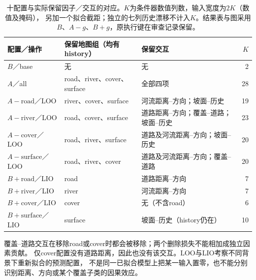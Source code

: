 \begin{table}[!htbp]\centering\small
\caption{十配置与实际保留因子／交互的对应。$K$为条件器数值列数，输入宽度为$2K$（数值及掩码），
另加一个拟合截距；独立的七列历史漂移不计入$K$。结果表与图采用$B$、$A-g$、$B+g$，原执行键在审查记录保留。}
\label{tab:main-terrain-configurations}
\begin{tabular}{@{}p{.23\linewidth}p{.28\linewidth}p{.35\linewidth}r@{}}\toprule
配置／操作 & 保留地图组（均有history） & 保留交互 & $K$\\\midrule
$B$／base & 无 & 无 & 2\\
$A$／all & road、river、cover、surface & 全部四项 & 28\\
$A-\mathrm{road}$／LOO & river、cover、surface & 河流距离--方向；坡面--历史 & 19\\
$A-\mathrm{river}$／LOO & road、cover、surface & 道路距离--方向；覆盖--道路；坡面--历史 & 23\\
$A-\mathrm{cover}$／LOO & road、river、surface & 道路及河流距离--方向；坡面--历史 & 20\\
$A-\mathrm{surface}$／LOO & road、river、cover & 道路及河流距离--方向；覆盖--道路 & 20\\
$B+\mathrm{road}$／LIO & road & 道路距离--方向 & 7\\
$B+\mathrm{river}$／LIO & river & 河流距离--方向 & 7\\
$B+\mathrm{cover}$／LIO & cover & 无（不含road） & 6\\
$B+\mathrm{surface}$／LIO & surface & 坡面--历史（history仍在） & 10\\\bottomrule
\end{tabular}\end{table}
覆盖--道路交互在移除road或cover时都会被移除；两个删除损失不能相加成独立因素贡献。
仅cover配置没有道路距离，因此也没有该交互。LOO与LIO考察不同背景下重新拟合的预测配置，
不是同一已拟合模型上把某一输入置零，也不能分别识别距离、方向或某个覆盖子类的因果效应。
\FloatBarrier
